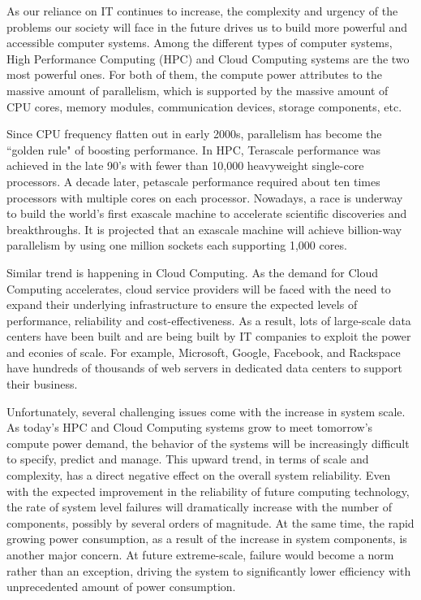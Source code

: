 As our reliance on IT continues to increase, the complexity and urgency of the problems our society will face 
in the future drives us to build more powerful and accessible computer systems. Among the different types of 
computer systems, High Performance Computing (HPC) and Cloud Computing systems are the two most powerful ones. 
For both of them, the compute power attributes to the massive amount of parallelism, which is supported by 
the massive amount of CPU cores, memory modules, communication devices, storage components, etc. 

Since CPU frequency flatten out in early 2000s, parallelism has become the ``golden rule" of boosting performance. 
In HPC, Terascale performance was achieved in the late 90’s with fewer than 10,000 heavyweight single-core processors. 
A decade later, petascale performance required about ten times processors with multiple cores on each processor. Nowadays, a race
is underway to build the world's first exascale machine to accelerate scientific discoveries and breakthroughs. It is 
projected that an exascale machine will achieve billion-way parallelism by using one million sockets each supporting 
1,000 cores. 

Similar trend is happening in Cloud Computing. 
As the demand for Cloud Computing accelerates, cloud service providers  
will be faced with the need to expand their underlying infrastructure to ensure the expected levels of performance, reliability and cost-effectiveness. 
As a result, lots of large-scale data centers have been built and are being built by IT companies
to exploit the power and econies of scale. 
For example, Microsoft, Google, Facebook, and Rackspace have hundreds of thousands 
of web servers in dedicated data centers to support their business. 

Unfortunately, several challenging issues come with the increase in system scale. As today's HPC and Cloud Computing systems grow to 
meet tomorrow's compute power demand, the behavior of the systems will be increasingly difficult to specify, predict and manage. 
This upward trend, in terms of scale and complexity, has a direct negative effect on the overall system reliability. 
Even with the expected improvement in the reliability of future computing technology, the rate of system level failures will 
dramatically increase with the number of components, possibly by several orders of magnitude. 
At the same time, the rapid 
growing power consumption, as a result of the increase in system components, is another major concern. 
At future extreme-scale, failure would become a norm rather than an exception, 
driving the system to significantly lower efficiency with unprecedented amount of power consumption. 

